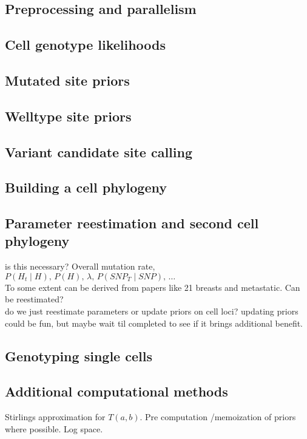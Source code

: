 \documentclass[../main.tex]{subfiles}
\begin{document}


\subsection{Preprocessing and parallelism}


\subsection{Cell genotype likelihoods}


\subsection{Mutated site priors}


\subsection{Welltype site priors}


\subsection{Variant candidate site calling}


\subsection{Building a cell phylogeny}


\subsection{Parameter reestimation and second cell phylogeny}
is this necessary? Overall mutation rate, $P(H_t\mid H),\,P(H),\,\lambda,\,P(SNP_T\mid SNP),\,\dots$\\
To some extent can be derived from papers like 21 breasts and metastatic. Can be reestimated?\\
do we just reestimate parameters or update priors on cell loci? updating priors could be fun, but maybe wait til completed to see if it brings additional benefit.\\



\subsection{Genotyping single cells}


\subsection{Additional computational methods}
Stirlings approximation for $T(a,b)$. Pre computation /memoization of priors where possible. Log space.
\end{document}
